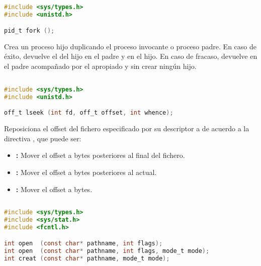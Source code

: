 \subsection{}\label{fork}

\begin{lstlisting}[language=C]
#include <sys/types.h>
#include <unistd.h>

pid_t fork ();
\end{lstlisting}

Crea un proceso hijo duplicando el proceso invocante o proceso padre.
En caso de éxito, devuelve el  del hijo en el padre y  en el hijo.
En caso de fracaso, devuelve  en el padre acompañado por el  apropiado y sin crear ningún hijo.

\subsection{}\label{lseek}

\begin{lstlisting}[language=C]
#include <sys/types.h>
#include <unistd.h>

off_t lseek (int fd, off_t offset, int whence);
\end{lstlisting}

Reposiciona el offset del fichero especificado por su descriptor  a  de acuerdo a la directiva , que puede ser:

\begin{itemize}
	\item{}\textbf{:} Mover el offset a  bytes posteriores al final del fichero.
	\item{}\textbf{:} Mover el offset a  bytes posteriores al actual.
	\item{}\textbf{:} Mover el offset a  bytes.
\end{itemize}

\subsection{}\label{open}

\begin{lstlisting}[language=C]
#include <sys/types.h>
#include <sys/stat.h>
#include <fcntl.h>

int open  (const char* pathname, int flags);
int open  (const char* pathname, int flags, mode_t mode);
int creat (const char* pathname, mode_t mode);
\end{lstlisting}

